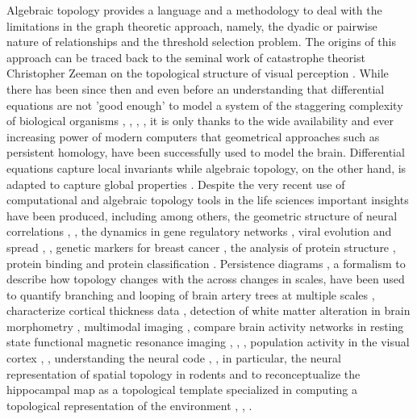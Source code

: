 \documentclass[onecollarge,runningheads]{svjour2}
\begin{document}
Algebraic topology \cite{munkres1984elements} provides a language and a methodology to deal with the limitations in the graph theoretic approach, namely, the dyadic or pairwise nature of relationships and the threshold selection problem. 
The origins of this approach can be traced back to the seminal work of catastrophe theorist Christopher Zeeman on the topological structure of visual perception \cite{zeeman:1962}. While there has been since then and even before an understanding that differential equations are not 'good enough' to model a system of the staggering complexity of biological organisms \cite{rosen1958representation}, \cite{Anderson:1972}, \cite{wolkenhauer2001systems}, \cite{boogerd_all_2007}, it is only thanks to the wide availability and ever increasing power of modern computers that geometrical approaches such as persistent homology, have been successfully used to model the brain. Differential equations capture local invariants while algebraic topology, on the other hand, is adapted to capture global properties \cite{hoffman1966lie}. 
Despite the very recent use of computational and algebraic topology tools in the life sciences important insights have been produced, including among others, the geometric structure of neural correlations \cite{giusti2015clique}, \cite{dotko2016topological}, the dynamics in gene regulatory networks \cite{boczko2005structure}, viral evolution and spread \cite{chan2013topology}, \cite{taylor2015topological}, genetic markers for breast cancer \cite{nicolau2011topology}, the analysis of protein structure \cite{xia2014persistent}, protein binding \cite{kovacev2016using} and protein classification \cite{cang2015topological}.
Persistence diagrams \cite{edelsbrunner2000topological}, a formalism to describe how topology changes with the
across changes in scales, have been used to quantify branching and looping of brain artery trees at multiple scales \cite{bendich2016persistent}, characterize cortical thickness data \cite{chung2009persistence}, detection of white matter alteration in brain morphometry \cite{chung2015persistent}, multimodal imaging \cite{lee2017integrated}, compare brain activity networks in resting state functional magnetic resonance imaging \cite{petri2014homological}, \cite{cassidy2015brain}, \cite{lord2016insights}, population activity in the visual cortex \cite{singh2008topological}, \cite{pirino2015topological}, understanding the neural code \cite{curto2017makes}, \cite{curto2017can}, in particular, the neural representation of spatial topology in rodents \cite{chen2014neural} and to reconceptualize the hippocampal map as a topological template specialized in computing a topological representation of the environment \cite{dabaghian2012topological}, \cite{dabaghian2014reconceiving}, \cite{babichev2016topological}.
\end{document}
